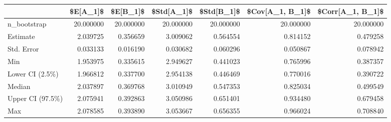 \begin{tabular}{lrrrrrr}
\toprule
{} &   \$E[A\_1]\$ &   \$E[B\_1]\$ &  \$Std[A\_1]\$ &  \$Std[B\_1]\$ &  \$Cov[A\_1, B\_1]\$ &  \$Corr[A\_1, B\_1]\$ \\
\midrule
n\_bootstrap      &  20.000000 &  20.000000 &   20.000000 &   20.000000 &        20.000000 &         20.000000 \\
Estimate         &   2.039725 &   0.356659 &    3.009062 &    0.564554 &         0.814152 &          0.479258 \\
Std. Error       &   0.033133 &   0.016190 &    0.030682 &    0.060296 &         0.050867 &          0.078942 \\
Min              &   1.953975 &   0.335615 &    2.949627 &    0.441023 &         0.765996 &          0.387357 \\
Lower CI (2.5\%)  &   1.966812 &   0.337700 &    2.954138 &    0.446469 &         0.770016 &          0.390722 \\
Median           &   2.037897 &   0.369768 &    3.010949 &    0.547353 &         0.825034 &          0.499549 \\
Upper CI (97.5\%) &   2.075941 &   0.392863 &    3.050986 &    0.651401 &         0.934480 &          0.679458 \\
Max              &   2.078585 &   0.393890 &    3.053667 &    0.656355 &         0.966024 &          0.708840 \\
\bottomrule
\end{tabular}
